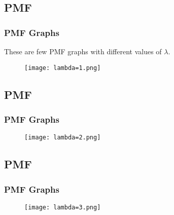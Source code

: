 \documentclass{beamer}
\begin{document}
\subsection{PMF}
\begin{frame}
\frametitle{PMF Graphs}
These are few PMF graphs with different values of $\lambda$.
\begin{figure}
    \texttt{[image: lambda=1.png]}
\end{figure}
\end{frame}
\subsection{PMF}
\begin{frame}
\frametitle{PMF Graphs}
\begin{figure}
    \texttt{[image: lambda=2.png]}
\end{figure}
\end{frame}
\subsection{PMF}
\begin{frame}
\frametitle{PMF Graphs}
\begin{figure}
    \texttt{[image: lambda=3.png]}
\end{figure}
\end{frame}
\end{document}
